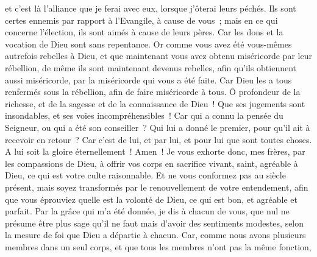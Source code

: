 \begin{multicols}{2}
et c'est là l'alliance que je ferai avec eux, lorsque j'ôterai leurs péchés.
Ils sont certes ennemis par rapport à l'Evangile, à cause de vous~; mais en ce qui concerne l'élection, ils sont aimés à cause de leurs pères.
Car les dons et la vocation de Dieu sont sans repentance.
Or comme vous avez été vous-mêmes autrefois rebelles à Dieu, et que maintenant vous avez obtenu miséricorde par leur rébellion,
de même ils sont maintenant devenus rebelles, afin qu'ils obtiennent aussi miséricorde, par la miséricorde qui vous a été faite.
Car Dieu les a tous renfermés sous la rébellion, afin de faire miséricorde à tous.
Ô profondeur de la richesse, et de la sagesse et de la connaissance de Dieu~! Que ses jugements sont insondables, et ses voies incompréhensibles~!
Car qui a connu la pensée du Seigneur, ou qui a été son conseiller~?
Qui lui a donné le premier, pour qu'il ait à recevoir en retour~?
Car c'est de lui, et par lui, et pour lui que sont toutes choses. A lui soit la gloire éternellement~! Amen~!
\VerseOne{}Je vous exhorte donc, mes frères, par les compassions de Dieu, à offrir vos corps en sacrifice vivant, saint, agréable à Dieu, ce qui est votre culte raisonnable.
Et ne vous conformez pas au siècle présent, mais soyez transformés par le renouvellement de votre entendement, afin que vous éprouviez quelle est la volonté de Dieu, ce qui est bon, et agréable et parfait.
Par la grâce qui m'a été donnée, je dis à chacun de vous, que nul ne présume être plus sage qu'il ne faut mais d'avoir des sentiments modestes, selon la mesure de foi que Dieu a départie à chacun.
Car, comme nous avons plusieurs membres dans un seul corps, et que tous les membres n'ont pas la même fonction,

\end{multicols}
